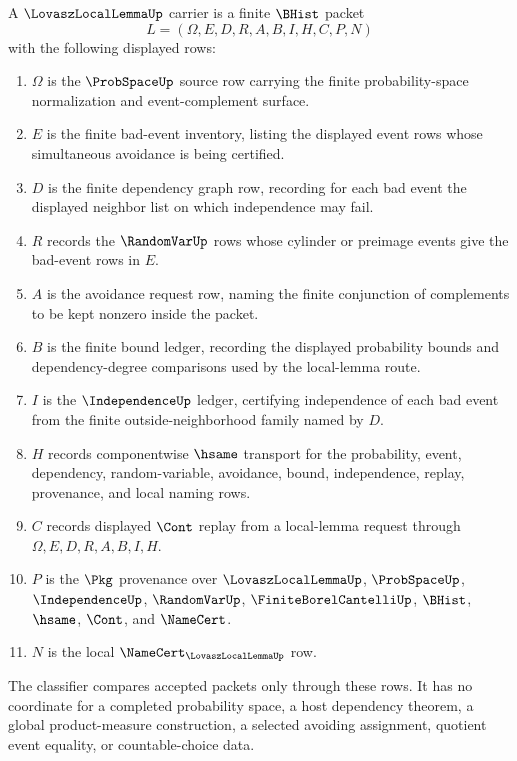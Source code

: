 \begin{definition}
\label{def:lovasz-local-lemma-carrier}
A $\LovaszLocalLemmaUp$ carrier is a finite $\BHist$ packet
$$
L=(\Omega,E,D,R,A,B,I,H,C,P,N)
$$
with the following displayed rows:
\begin{enumerate}
\item $\Omega$ is the $\ProbSpaceUp$ source row carrying the finite probability-space normalization and event-complement surface.
\item $E$ is the finite bad-event inventory, listing the displayed event rows whose simultaneous avoidance is being certified.
\item $D$ is the finite dependency graph row, recording for each bad event the displayed neighbor list on which independence may fail.
\item $R$ records the $\RandomVarUp$ rows whose cylinder or preimage events give the bad-event rows in $E$.
\item $A$ is the avoidance request row, naming the finite conjunction of complements to be kept nonzero inside the packet.
\item $B$ is the finite bound ledger, recording the displayed probability bounds and dependency-degree comparisons used by the local-lemma route.
\item $I$ is the $\IndependenceUp$ ledger, certifying independence of each bad event from the finite outside-neighborhood family named by $D$.
\item $H$ records componentwise $\hsame$ transport for the probability, event, dependency, random-variable, avoidance, bound, independence, replay, provenance, and local naming rows.
\item $C$ records displayed $\Cont$ replay from a local-lemma request through $\Omega,E,D,R,A,B,I,H$.
\item $P$ is the $\Pkg$ provenance over $\LovaszLocalLemmaUp$, $\ProbSpaceUp$, $\IndependenceUp$, $\RandomVarUp$, $\FiniteBorelCantelliUp$, $\BHist$, $\hsame$, $\Cont$, and $\NameCert$.
\item $N$ is the local $\NameCert_{\LovaszLocalLemmaUp}$ row.
\end{enumerate}
The classifier compares accepted packets only through these rows. It has no coordinate for a completed probability space, a host dependency theorem, a global product-measure construction, a selected avoiding assignment, quotient event equality, or countable-choice data.
\end{definition}


